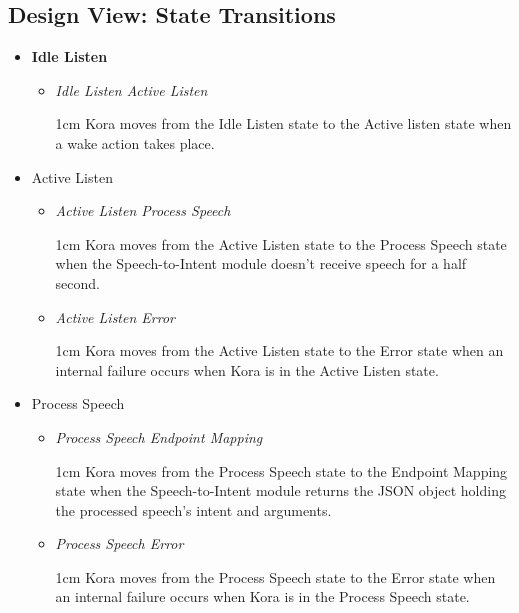 \documentclass[onecolumn, draftclsnofoot,10pt, compsoc]{IEEEtran}
\newenvironment{indentItem}[1][1cm]{\begin{adjustwidth}{#1}{}}{\end{adjustwidth}}
\begin{document}
	
	\subsection{Design View: State Transitions}
		\begin{itemize}	
			\item \textbf{Idle Listen}
			\begin{itemize}
				\item \textit{Idle Listen \textrightarrow{}  Active Listen}
				\begin{indentItem}
					Kora moves from the Idle Listen state to the Active listen state when a wake action takes place.
				\end{indentItem}
			\end{itemize}
		
		\item Active Listen
		\begin{itemize}
			\item \textit{Active Listen \textrightarrow{}  Process Speech}
			\begin{indentItem}
				Kora moves from the Active Listen state to the Process Speech state when the Speech-to-Intent module doesn't receive speech for a half second.
			\end{indentItem}
			\item \textit{Active Listen \textrightarrow{}  Error}
			\begin{indentItem}
				Kora moves from the Active Listen state to the Error state when an internal failure occurs when Kora is in the Active Listen state.
			\end{indentItem}
		\end{itemize}
		
		\item Process Speech
		\begin{itemize}
			\item \textit{Process Speech \textrightarrow{} Endpoint Mapping}
			\begin{indentItem}
				Kora moves from the Process Speech state to the Endpoint Mapping state when the Speech-to-Intent module returns the JSON object holding the processed speech's intent and arguments.
			\end{indentItem}
			\item \textit{Process Speech \textrightarrow{} Error}
			\begin{indentItem}
				Kora moves from the Process Speech state to the Error state when an internal failure occurs when Kora is in the Process Speech state.
			\end{indentItem}
		\end{itemize}
		

\end{itemize}
\end{document}
